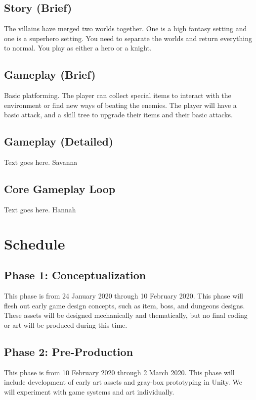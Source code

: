 \documentclass[titlepage]{article}
\begin{document}
\subsection*{Story (Brief)}
The villains have merged two worlds together. One is a high fantasy setting and
one is a superhero setting. You need to separate the worlds and return
everything to normal. You play as either a hero or a knight. 

\subsection*{Gameplay (Brief)}
Basic platforming. The player can collect special items to interact with the
environment or find new ways of beating the enemies. The player will have a
basic attack, and a skill tree to upgrade their items and their basic attacks.  

\subsection*{Gameplay (Detailed)}
Text goes here. Savanna

\subsection*{Core Gameplay Loop}
Text goes here. Hannah

\section{Schedule}

\subsection*{Phase 1: Conceptualization}

This phase is from 24 January 2020 through 10 February 2020. This phase will
flesh out early game design concepts, such as item, boss, and dungeons designs.
These assets will be designed mechanically and thematically, but no final coding
or art will be produced during this time.

\subsection*{Phase 2: Pre-Production}

This phase is from 10 February 2020 through 2 March 2020. This phase will
include development of early art assets and gray-box prototyping in Unity.
We will experiment with game systems and art individually.
\end{document}
